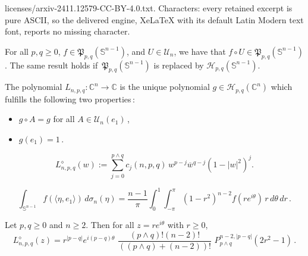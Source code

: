 \documentclass[10pt,a4paper]{amsart}
\begin{document}
licenses/arxiv-2411.12579-CC-BY-4.0.txt. Characters: every retained excerpt is pure ASCII, so the delivered engine, XeLaTeX with its default Latin Modern text font, reports no missing character.
\begin{lemma} \label{lemma: invariance}
For all $ p, q \geq 0 $, $ f \in \mathfrak{P}_{p,q}(\mathbb{S}^{n-1}) $, and $ U \in \mathcal{U}_n $, we have that $ f \circ U \in \mathfrak{P}_{p,q}(\mathbb{S}^{n-1}) $. The same result holds if\,
$\mathfrak{P}_{p,q}(\mathbb{S}^{n-1}) $  is replaced by $ \mathcal{H}_{p,q}(\mathbb{S}^{n-1}) $.
\end{lemma}

\begin{proposition} \label{propleg-comp}
The polynomial  $L_{n,p,q} \colon \mathbb{C}^n \to \mathbb{C} $ is the unique  polynomial
$g \in \mathcal{H}_{p,q}(\mathbb{C}^n) $ which fulfills the following two properties\,:
\begin{itemize}
\item[(a)]
$g\circ A = g $ for all  $A\in \mathcal{U}_n(e_1)$\,,
\item[(b)]
$g(e_1) = 1 $\,.
\end{itemize}
\end{proposition}

\begin{equation} \label{repro}
  L_{n,p,q}^{\diamond}(w) :=
    \sum_{j=0}^{p\wedge q} c_j(n,p,q) \,w^{p-j} \overline{w}^{q-j}
    (1 - |w|^2)^{j}.
\end{equation}

\begin{equation}\label{integration}
\int_{\mathbb{S}^{n-1}} f(\langle \eta , e_1 \rangle) \, d\sigma_n(\eta) =
\frac{n-1}{\pi} \int_{0}^{1} \int_{-\pi}^{\pi} (1-r^2)^{n-2} f(r e^{i\theta}) \, r \, d\theta \,dr \,.
\end{equation}

\begin{theorem} \label{Koornwinder}
  Let  $p,q \geq 0 $ and  $n \geq 2 $. Then for all  $z = r e^{i \theta} $ with  $r\geq0 $,
  \[
  L^{\diamond}_{n,p,q}(z) = r^{|p-q|}  e^{i(p-q)\theta}
  \,\,
  \frac{(p\wedge q)!(n-2)!}{((p\wedge q) + (n-2))!}
  \,\,
  P_{p\wedge q}^{n-2,|p-q|}(2r^2 -1)\,.
  \]
\end{theorem}
\end{document}
